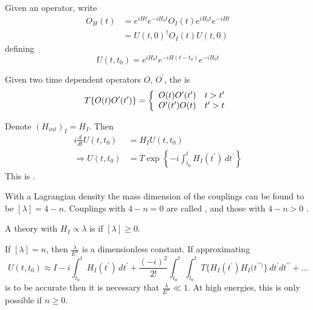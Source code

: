 \documentclass{article}
\begin{document}
\begin{definition}[$U(t,t_0)$]
Given an operator, write 
\begin{align*}
O_H(t) &= e^{iHt} e^{-iH_0t} O_I(t) e^{iH_0t}e^{-iHt} \\
 &= U(t,0)^\dagger O_I(t) U(t,0)
\end{align*}
defining 
\[
U(t,t_0) = e^{iH_0 t}e^{-iH (t-t_0)} e^{-iH_0 t}
\]
\end{definition}

\begin{definition}
Given two time dependent operators $O$, $O^\prime$, the  is 
\[
T \{ O(t) O^\prime(t^\prime) \} = \left\{ \begin{array}{lc} O(t) O^\prime(t^\prime) & t > t^\prime \\
    O^\prime(t^\prime) O(t) & t^\prime > t 
    \end{array} \right. \\
\]
\end{definition}

\begin{theorem}
Denote $(H_{int})_I = H_I$. Then 
\begin{align*}
i \frac{d}{dt} U(t,t_0) &= H_I U(t,t_0) \\
\Rightarrow U(t,t_0) &= T \exp\left\{ -i \int_{t_0}^t H_I(t^\prime) \, dt^\prime \right\}
\end{align*}
This is . 
\end{theorem}

\begin{definition}
With a Lagrangian density 
the mass dimension of the couplings can be found to be $[\lambda] = 4-n$. Couplings with $4-n = 0$ are called , and those with $4-n > 0$ . 
\end{definition}

\begin{definition}[Renormalizable]
A theory with $H_I \propto \lambda$ is  if $[\lambda]\geq0$. 
\end{definition}

\begin{idea}
If $[\lambda]=n$, then $\frac{\lambda}{E^n}$ is a dimensionless constant. If approximating 
\[
U(t,t_0) \approx I -i\int_{t_0}^t H_I(t^\prime) \, dt^\prime + \frac{(-i)^2}{2!}\int_{t_0}^t \int_{t_0}^t T\{ H_I(t^\prime) H_I(t^{\prime\prime)} \} \, dt^\prime dt^{\prime\prime} + \dots
\]
is to be accurate then it is necessary that $\frac{\lambda}{E^n} \ll 1$. At high energies, this is only possible if $n\geq0$.
\end{idea}
\end{document}

